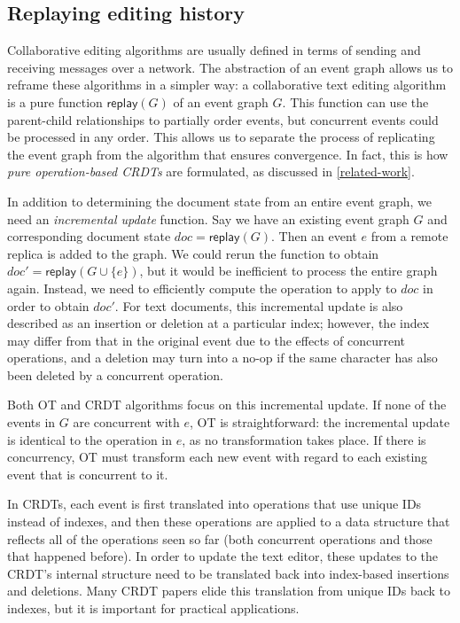 \documentclass[sigplan,10pt]{acmart}
\begin{document}
\subsection{Replaying editing history}\label{replay}

Collaborative editing algorithms are usually defined in terms of sending and receiving messages over a network.
The abstraction of an event graph allows us to reframe these algorithms in a simpler way: a collaborative text editing algorithm is a pure function $\mathsf{replay}(G)$ of an event graph $G$.
This function can use the parent-child relationships to partially order events, but concurrent events could be processed in any order.
This allows us to separate the process of replicating the event graph from the algorithm that ensures convergence.
In fact, this is how \emph{pure operation-based CRDTs} \cite{polog} are formulated, as discussed in \autoref{related-work}.

In addition to determining the document state from an entire event graph, we need an \emph{incremental update} function.
Say we have an existing event graph $G$ and corresponding document state $\mathit{doc} = \mathsf{replay}(G)$. Then an event $e$ from a remote replica is added to the graph.
We could rerun the function to obtain $\mathit{doc}' = \mathsf{replay}(G \cup \{e\})$, but it would be inefficient to process the entire graph again.
Instead, we need to efficiently compute the operation to apply to $\mathit{doc}$ in order to obtain $\mathit{doc}'$.
For text documents, this incremental update is also described as an insertion or deletion at a particular index; however, the index may differ from that in the original event due to the effects of concurrent operations, and a deletion may turn into a no-op if the same character has also been deleted by a concurrent operation.

Both OT and CRDT algorithms focus on this incremental update.
If none of the events in $G$ are concurrent with $e$, OT is straightforward: the incremental update is identical to the operation in $e$, as no transformation takes place.
If there is concurrency, OT must transform each new event with regard to each existing event that is concurrent to it.

In CRDTs, each event is first translated into operations that use unique IDs instead of indexes, and then these operations are applied to a data structure that reflects all of the operations seen so far (both concurrent operations and those that happened before).
In order to update the text editor, these updates to the CRDT's internal structure need to be translated back into index-based insertions and deletions.
Many CRDT papers elide this translation from unique IDs back to indexes, but it is important for practical applications. %
\end{document}

